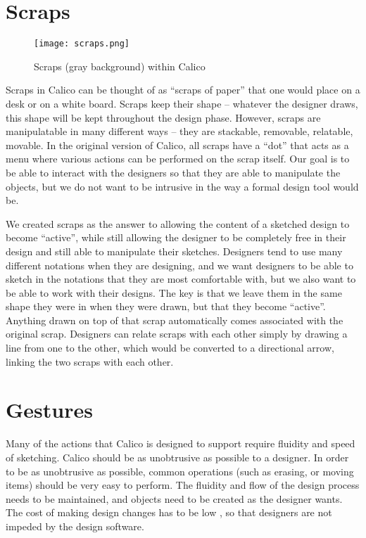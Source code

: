 \section{Scraps}

\begin{figure}[htb]
  \centering
  \texttt{[image: scraps.png]}
  \caption{Scraps (gray background) within Calico}
  \label{fig:scraps}
\end{figure}

Scraps in Calico can be thought of as ``scraps of paper'' that one would place on a desk or on a white board.
Scraps keep their shape -- whatever the designer draws, this shape will be kept throughout the design phase.
However, scraps are manipulatable in many different ways -- they are stackable, removable, relatable, movable. 
In the original version of Calico, all scraps have a ``dot'' that acts as a menu where various actions can be performed on the scrap itself.
Our goal is to be able to interact with the designers so that they are able to manipulate the objects, but we do not want to be intrusive in the way a formal design tool would be.

We created scraps as the answer to allowing the content of a sketched design to become ``active'', while still allowing the designer to be completely free in their design and still able to manipulate their sketches.
Designers tend to use many different notations when they are designing, and we want designers to be able to sketch in the notations that they are most comfortable with, but we also want to be able to work with their designs.
The key is that we leave them in the same shape they were in when they were drawn, but that they become ``active''. 
Anything drawn on top of that scrap automatically comes associated with the original scrap.
Designers can relate scraps with each other simply by drawing a line from one to the other, which would be converted to a directional arrow, linking the two scraps with each other.



\section{Gestures}
Many of the actions that Calico is designed to support require fluidity and speed of sketching. Calico should be as unobtrusive as possible to a designer. In order to be as unobtrusive as possible, common operations (such as erasing, or moving items) should be very easy to perform. The fluidity and flow of the design process needs to be maintained, and objects need to be created as the designer wants. The cost of making design changes has to be low \cite{design_fluidity}, so that designers are not impeded by the design software.

